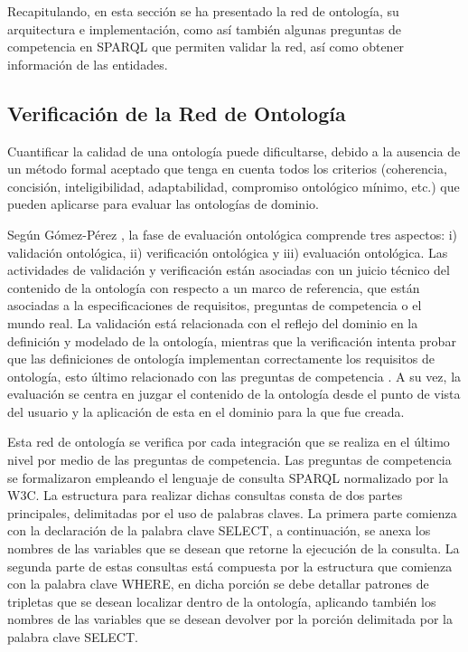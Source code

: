 \documentclass[journal]{IEEEtran}
\begin{document}
Recapitulando, en esta secci\'on se ha presentado la red de ontolog\'ia, su arquitectura e implementaci\'on, como as\'i tambi\'en algunas preguntas de competencia en SPARQL que permiten validar la red, as\'i como obtener informaci\'on de las entidades. 



\subsection{Verificaci\'on de la Red de Ontolog\'ia}

Cuantificar la calidad de una ontolog\'ia puede dificultarse, debido a la ausencia de un método formal aceptado que tenga en cuenta todos los criterios (coherencia, concisi\'on, inteligibilidad, adaptabilidad, compromiso ontol\'ogico m\'inimo, etc.) que pueden aplicarse para evaluar las ontolog\'ias de dominio.

Seg\'un G\'omez-P\'erez \cite{Gomez-Perez2007OntologicalWeb}, la fase de evaluaci\'on ontol\'ogica comprende tres aspectos: i) validaci\'on ontol\'ogica, ii) verificaci\'on ontol\'ogica y iii) evaluaci\'on ontol\'ogica. Las actividades de validaci\'on y verificaci\'on est\'an asociadas con un juicio t\'ecnico del contenido de la ontolog\'ia con respecto a un marco de referencia, que est\'an asociadas a la especificaciones de requisitos, preguntas de competencia o el mundo real. La validaci\'on est\'a relacionada con el reflejo del dominio en la definici\'on y modelado de la ontolog\'ia, mientras que la verificaci\'on intenta probar que las definiciones de ontolog\'ia implementan correctamente los requisitos de ontolog\'ia, esto \'ultimo relacionado con las preguntas de competencia \cite{Bezerra2013EvaluatingQuestions}. A su vez, la evaluaci\'on se centra en juzgar el contenido de la ontolog\'ia desde el punto de vista del usuario y la aplicaci\'on de esta en el dominio para la que fue creada. 

Esta red de ontolog\'ia se verifica por cada integraci\'on que se realiza en el \'ultimo nivel por medio de las preguntas de competencia. Las preguntas de competencia se formalizaron empleando el lenguaje de consulta SPARQL normalizado por la W3C. La estructura para realizar dichas consultas consta de dos partes principales, delimitadas por el uso de palabras claves. La primera parte comienza con la declaraci\'on de la palabra clave SELECT, a continuaci\'on, se anexa los nombres de las variables que se desean que retorne la ejecuci\'on de la consulta. La segunda parte de estas consultas est\'a compuesta por la estructura que comienza con la palabra clave WHERE, en dicha porci\'on se debe detallar patrones de tripletas que se desean localizar dentro de la ontolog\'ia, aplicando tambi\'en los nombres de las variables que se desean devolver por la porci\'on delimitada por la palabra clave SELECT. 
\end{document}
